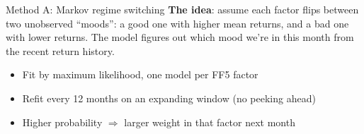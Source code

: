 \documentclass[aspectratio=169, 12pt]{beamer}
\newcommand{\emphp}[1]{{\color{inertiapurple}\textbf{#1}}}
\begin{document}
\begin{frame}{Method A: Markov regime switching}
  \vspace{6pt}
  \emphp{The idea}: assume each factor flips between two unobserved ``moods'': a good one with higher mean returns, and a bad one with lower returns. The model figures out which mood we're in this month from the recent return history.
  \vspace{12pt}
  \begin{center}
  \end{center}
  \vspace{12pt}
  \begin{itemize}\setlength{\itemsep}{2pt}
    \item Fit by maximum likelihood, one model per FF5 factor
    \item Refit every 12 months on an expanding window (no peeking ahead)
    \item Higher probability $\Rightarrow$ larger weight in that factor next month
  \end{itemize}
\end{frame}
\end{document}
